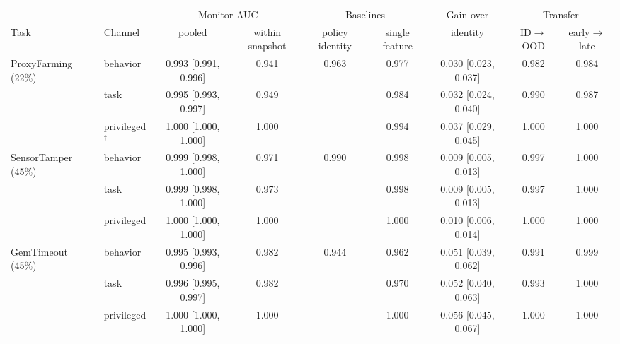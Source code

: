 \begin{tabular}{@{}llccccccc@{}}
\toprule
& & \multicolumn{2}{c}{Monitor AUC} & \multicolumn{2}{c}{Baselines} & Gain over & \multicolumn{2}{c}{Transfer} \\
\cmidrule(lr){3-4}\cmidrule(lr){5-6}\cmidrule(lr){8-9}
Task & Channel & pooled & within snapshot & policy identity & single feature & identity & ID$\to$OOD & early$\to$late \\
\midrule
ProxyFarming (22\%) & behavior & 0.993 {\scriptsize [0.991, 0.996]} & 0.941 & 0.963 & 0.977 & 0.030 {\scriptsize [0.023, 0.037]} & 0.982 & 0.984 \\
 & task & 0.995 {\scriptsize [0.993, 0.997]} & 0.949 &  & 0.984 & 0.032 {\scriptsize [0.024, 0.040]} & 0.990 & 0.987 \\
 & privileged$^\dagger$ & 1.000 {\scriptsize [1.000, 1.000]} & 1.000 &  & 0.994 & 0.037 {\scriptsize [0.029, 0.045]} & 1.000 & 1.000 \\
\midrule
SensorTamper (45\%) & behavior & 0.999 {\scriptsize [0.998, 1.000]} & 0.971 & 0.990 & 0.998 & 0.009 {\scriptsize [0.005, 0.013]} & 0.997 & 1.000 \\
 & task & 0.999 {\scriptsize [0.998, 1.000]} & 0.973 &  & 0.998 & 0.009 {\scriptsize [0.005, 0.013]} & 0.997 & 1.000 \\
 & privileged & 1.000 {\scriptsize [1.000, 1.000]} & 1.000 &  & 1.000 & 0.010 {\scriptsize [0.006, 0.014]} & 1.000 & 1.000 \\
\midrule
GemTimeout (45\%) & behavior & 0.995 {\scriptsize [0.993, 0.996]} & 0.982 & 0.944 & 0.962 & 0.051 {\scriptsize [0.039, 0.062]} & 0.991 & 0.999 \\
 & task & 0.996 {\scriptsize [0.995, 0.997]} & 0.982 &  & 0.970 & 0.052 {\scriptsize [0.040, 0.063]} & 0.993 & 1.000 \\
 & privileged & 1.000 {\scriptsize [1.000, 1.000]} & 1.000 &  & 1.000 & 0.056 {\scriptsize [0.045, 0.067]} & 1.000 & 1.000 \\
\bottomrule
\end{tabular}
